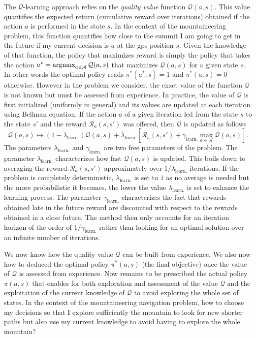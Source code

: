 The $\mathcal{Q}$-learning approach relies on the \textit{quality value} function $\mathcal{Q}(a, s)$.
This value quantifies the expected return (cumulative reward over iterations) obtained if the action $a$ is performed in the state $s$.
In the context of the mountaineering problem, this function quantifies how close to the summit I am going to get in the future if my current decision is $a$ at the gps position $s$.
Given the knowledge of that function, the policy that maximizes reward is simply the policy that takes the action $a^* = \operatorname{argmax}_{a \in \mathcal{A}} \mathcal{Q}(a, s)$ that maximizes $\mathcal{Q}(a, s)$ for a given state $s$.
In other words the optimal policy reads $\pi^*(a^*, s) = 1$ and $\pi^*(a, s) = 0$ otherwise.
However in the problem we consider, the exact value of the function $\mathcal{Q}$ is not known but must be assessed from experience.
In practice, the value of $\mathcal{Q}$ is first initialized (uniformly in general) and its values are updated at each iteration using Bellman equation.
If the action $a$ of a given iteration led from the state $s$ to the state $s'$ and the reward $\mathcal{R}_a(s, s')$ was offered, then $\mathcal{Q}$ is updated as follows
\begin{equation}
	\mathcal{Q}(a, s) \mapsto (1 - \lambda_{\mathrm{learn.}}) \mathcal{Q}(a, s) + \lambda_{\mathrm{learn.}} \left[ \mathcal{R}_a(s, s') + \gamma_{\mathrm{learn.}} \max_{a \in \mathcal{A}} \mathcal{Q}(a, s) \right].
\end{equation}
The parameters $\lambda_{\mathrm{learn.}}$ and $\gamma_{\mathrm{learn.}}$ are two free parameters of the problem.
The parameter $\lambda_{\mathrm{learn.}}$ characterizes how fast $\mathcal{Q}(a, s)$ is updated.
This boils down to averaging the reward $\mathcal{R}_a(s, s')$ approximately over $1/\lambda_{\mathrm{learn.}}$ iterations.
If the problem is completely deterministic, $\lambda_{\mathrm{learn.}}$ is set to $1$ as no average is needed but the more probabilistic it becomes, the lower the value $\lambda_{\mathrm{learn.}}$ is set to enhance the learning process.
The parameter $\gamma_{\mathrm{learn.}}$ characterizes the fact that rewards obtained late in the future reward are discounted with respect to the rewards obtained in a close future.
The method then only accounts for an iteration horizon of the order of $1/\gamma_{\mathrm{learn.}}$ rather than looking for an optimal solution over an infinite number of iterations.

We now know how the quality value $\mathcal{Q}$ can be built from experience.
We also now how to deduced the optimal policy $\pi^*(a, s)$ (the final objective) once the value of $\mathcal{Q}$ is assessed from experience.
Now remains to be prescribed the actual policy $\pi(a, s)$ that enables for both exploration and assessment of the value $\mathcal{Q}$ and the exploitation of the current knowledge of $\mathcal{Q}$ to avoid exploring the whole set of states.
In the context of the mountaineering navigation problem, how to choose my decisions so that I explore sufficiently the mountain to look for new shorter paths but also use my current knowledge to avoid having to explore the whole mountain?

